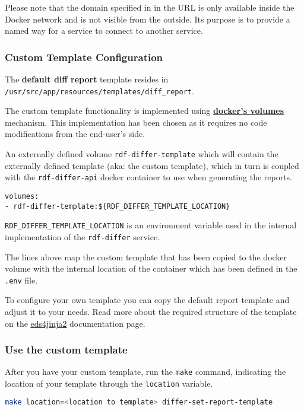 	Please note that the domain specified in in the URL is only available inside the Docker network and is not visible from the outside. Its purpose is to provide a named way for a service to connect to another service. 

		\subsubsection{Custom Template Configuration}
		The \textbf{default diff report} template resides in \\ \texttt{/usr/src/app/resources/templates/diff\_report}.

		The custom template functionality is implemented using \textbf{\href{https://docs.docker.com/storage/volumes/}{docker's volumes}} mechanism. This implementation has been chosen as it requires no code modifications from the end-user's side.
		
		An externally defined volume \texttt{rdf-differ-template} which will contain the externally defined template (aka: the custom template), which in turn is coupled with the \texttt{rdf-differ-api} docker container to use when generating the reports.

		\begin{lstlisting}[]
volumes:
- rdf-differ-template:${RDF_DIFFER_TEMPLATE_LOCATION}
		\end{lstlisting}

		\texttt{RDF\_DIFFER\_TEMPLATE\_LOCATION} is an environment variable used in the internal implementation of the \texttt{rdf-differ} service.

		The lines above map the custom template that has been copied to the docker volume with the internal location of the container which has been defined in the \texttt{.env} file.
		
		To configure your own template you can copy the default report template and adjust it to your needs. Read more about the required structure of the template on the \href{https://eds4jinja2.readthedocs.io/en/latest/#target-directory-layout}{\underline{eds4jinja2}} documentation page.
		 
		\subsubsection{Use the custom template}
		After you have your custom template, run the \texttt{make} command, indicating the location of your template through the \texttt{location} variable.
		\begin{lstlisting}[language=bash]
make location=<location to template> differ-set-report-template
		\end{lstlisting}

